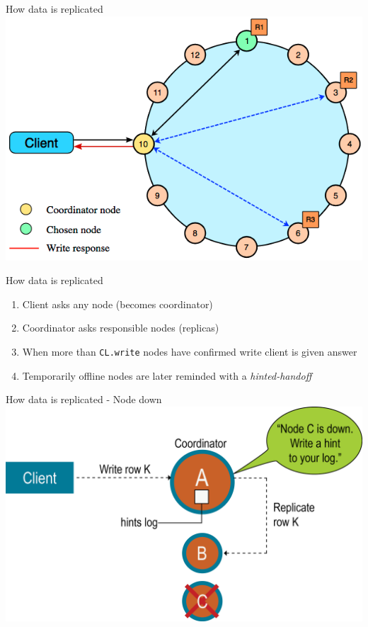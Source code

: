 \documentclass[
  10pt
]{beamer}
\begin{document}
\begin{frame}{How data is replicated}
  \includegraphics[width=1.0\textwidth]{resources/distributed_write.png}
\end{frame}

\begin{frame}{How data is replicated}
  \begin{enumerate}
    \item<1-> Client asks any node (becomes coordinator)
    \item<2-> Coordinator asks responsible nodes (replicas)
    \item<3-> When more than \lstinline{CL.write} nodes have confirmed write client is given answer
    \item<4-> Temporarily offline nodes are later reminded with a \textit{hinted-handoff}
  \end{enumerate}
\end{frame}

\begin{frame}{How data is replicated - Node down}
  \includegraphics[width=1.0\textwidth]{resources/hinted_handoff.png}
\end{frame}
\end{document}
